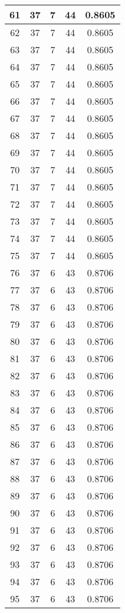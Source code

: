 \documentclass[letterpaper, 12pt]{article}
\begin{document}
\begin{longtable}{|c|c|c|c|c|}
\hline
61 & 37 & 7 & 44 & 0.8605 \\
\hline
62 & 37 & 7 & 44 & 0.8605 \\
\hline
63 & 37 & 7 & 44 & 0.8605 \\
\hline
64 & 37 & 7 & 44 & 0.8605 \\
\hline
65 & 37 & 7 & 44 & 0.8605 \\
\hline
66 & 37 & 7 & 44 & 0.8605 \\
\hline
67 & 37 & 7 & 44 & 0.8605 \\
\hline
68 & 37 & 7 & 44 & 0.8605 \\
\hline
69 & 37 & 7 & 44 & 0.8605 \\
\hline
70 & 37 & 7 & 44 & 0.8605 \\
\hline
71 & 37 & 7 & 44 & 0.8605 \\
\hline
72 & 37 & 7 & 44 & 0.8605 \\
\hline
73 & 37 & 7 & 44 & 0.8605 \\
\hline
74 & 37 & 7 & 44 & 0.8605 \\
\hline
75 & 37 & 7 & 44 & 0.8605 \\
\hline
76 & 37 & 6 & 43 & 0.8706 \\
\hline
77 & 37 & 6 & 43 & 0.8706 \\
\hline
78 & 37 & 6 & 43 & 0.8706 \\
\hline
79 & 37 & 6 & 43 & 0.8706 \\
\hline
80 & 37 & 6 & 43 & 0.8706 \\
\hline
81 & 37 & 6 & 43 & 0.8706 \\
\hline
82 & 37 & 6 & 43 & 0.8706 \\
\hline
83 & 37 & 6 & 43 & 0.8706 \\
\hline
84 & 37 & 6 & 43 & 0.8706 \\
\hline
85 & 37 & 6 & 43 & 0.8706 \\
\hline
86 & 37 & 6 & 43 & 0.8706 \\
\hline
87 & 37 & 6 & 43 & 0.8706 \\
\hline
88 & 37 & 6 & 43 & 0.8706 \\
\hline
89 & 37 & 6 & 43 & 0.8706 \\
\hline
90 & 37 & 6 & 43 & 0.8706 \\
\hline
91 & 37 & 6 & 43 & 0.8706 \\
\hline
92 & 37 & 6 & 43 & 0.8706 \\
\hline
93 & 37 & 6 & 43 & 0.8706 \\
\hline
94 & 37 & 6 & 43 & 0.8706 \\
\hline
95 & 37 & 6 & 43 & 0.8706 \\

\end{longtable}
\end{document}
